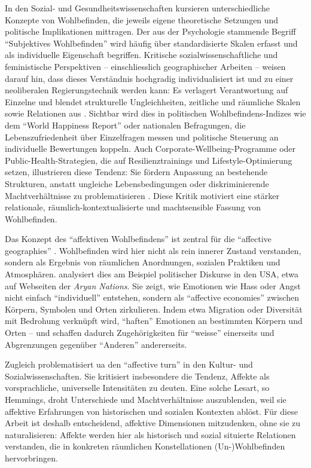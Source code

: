 In den Sozial- und Gesundheitswissenschaften kursieren unterschiedliche Konzepte von Wohlbefinden, die jeweils eigene theoretische Setzungen und politische Implikationen mittragen. Der aus der Psychologie stammende Begriff \enquote{Subjektives Wohlbefinden} wird häufig über standardisierte Skalen erfasst und als individuelle Eigenschaft begriffen. Kritische sozialwissenschaftliche und feministische Perspektiven -- einschliesslich geographischer Arbeiten -- weisen darauf hin, dass dieses Verständnis hochgradig individualisiert ist und zu einer neoliberalen Regierungstechnik werden kann: Es verlagert Verantwortung auf Einzelne und blendet strukturelle Ungleichheiten, zeitliche und räumliche Skalen sowie Relationen aus \parencite{atkinsonToxicEffectsSubjective2021}. Sichtbar wird dies in politischen Wohlbefindens-Indizes wie dem \enquote{World Happiness Report} oder nationalen Befragungen, die Lebenszufriedenheit über Einzelfragen messen und politische Steuerung an individuelle Bewertungen koppeln. Auch Corporate-Wellbeing-Programme oder Public-Health-Strategien, die auf Resilienztrainings und Lifestyle-Optimierung setzen, illustrieren diese Tendenz: Sie fördern Anpassung an bestehende Strukturen, anstatt ungleiche Lebensbedingungen oder diskriminierende Machtverhältnisse zu problematisieren \parencite[\gls{vgl}][]{atkinsonToxicEffectsSubjective2021}. Diese Kritik motiviert eine stärker relationale, räumlich-kontextualisierte und machtsensible Fassung von Wohlbefinden.

Das Konzept des \enquote{affektiven Wohlbefindens} ist zentral für die \enquote{affective geographies} \parencite{hoSocialGeographyIII2024}. Wohlbefinden wird hier nicht als rein innerer Zustand verstanden, sondern als Ergebnis von räumlichen Anordnungen, sozialen Praktiken und Atmosphären. \textcite{ahmedAffectiveEconomies2004} analysiert dies am Beispiel politischer Diskurse in den USA, etwa auf Webseiten der \emph{Aryan Nations}. Sie zeigt, wie Emotionen wie Hass oder Angst nicht einfach \enquote{individuell} entstehen, sondern als \enquote{affective economies} zwischen Körpern, Symbolen und Orten zirkulieren. Indem etwa Migration oder Diversität mit Bedrohung verknüpft wird, \enquote{haften} Emotionen an bestimmten Körpern und Orten -- und schaffen dadurch Zugehörigkeiten für \enquote{weisse} einerseits und Abgrenzungen gegenüber \enquote{Anderen} andererseits.

Zugleich problematisiert \gls{ua} \textcite{hemmingsInvokingAffectCultural2005} den \enquote{affective turn} in den Kultur- und Sozialwissenschaften. Sie kritisiert insbesondere die Tendenz, Affekte als vorsprachliche, universelle Intensitäten zu deuten. Eine solche Lesart, so Hemmings, droht Unterschiede und Machtverhältnisse auszublenden, weil sie affektive Erfahrungen von historischen und sozialen Kontexten ablöst. Für diese Arbeit ist deshalb entscheidend, affektive Dimensionen mitzudenken, ohne sie zu naturalisieren: Affekte werden hier als historisch und sozial situierte Relationen verstanden, die in konkreten räumlichen Konstellationen (Un\nobreakdash-)Wohl\-be\-find\-en hervorbringen.


